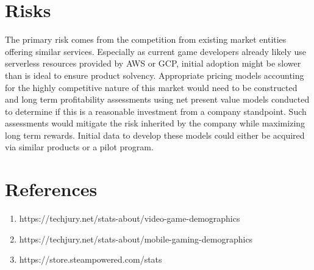 \documentclass[a4paper, 11pt]{article}
\begin{document}
\section{Risks}
The primary risk comes from the competition from existing market entities offering similar services. Especially as current game developers already likely use serverless resources provided by AWS or GCP, initial adoption might be slower than is ideal to ensure product solvency. Appropriate pricing models accounting for the highly competitive nature of this market would need to be constructed and long term profitability assessments using net present value models conducted to determine if this is a reasonable investment from a company standpoint. Such assessments would mitigate the risk inherited by the company while maximizing long term rewards. Initial data to develop these models could either be acquired via similar products or a pilot program.

\section{References}
\begin{enumerate}[1.]
\item 
https://techjury.net/stats-about/video-game-demographics

\item
https://techjury.net/stats-about/mobile-gaming-demographics

\item
https://store.steampowered.com/stats


\end{enumerate}
\end{document}
